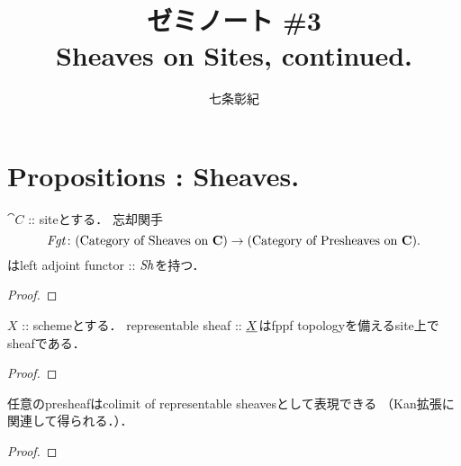 \documentclass[a4paper]{jsarticle}
\begin{document}
\title{ゼミノート \#3 \\ Sheaves on Sites, continued.}
\author{七条彰紀}
\maketitle

\section{Propositions : Sheaves.}
\begin{Thm}
    $\cat{C}$ :: siteとする．
    忘却関手
    \[
        \mathit{Fgt} \colon
        \text{(Category of Sheaves on $\mathbf{C}$)}
            \to \text{(Category of Presheaves on $\mathbf{C}$)}.
    \]
    はleft adjoint functor :: $\mathit{Sh}$を持つ．
\end{Thm}
\begin{proof}
\end{proof}

\begin{Prop}
    $X$ :: schemeとする．
    representable sheaf :: $\underline{X}$はfppf topologyを備えるsite上でsheafである．
\end{Prop}
\begin{proof}
\end{proof}

\begin{Thm}
    
\end{Thm}

\begin{Prop}
    任意のpresheafはcolimit of representable sheavesとして表現できる
    （Kan拡張に関連して得られる．）．
\end{Prop}
\begin{proof}
\end{proof}
\end{document}
